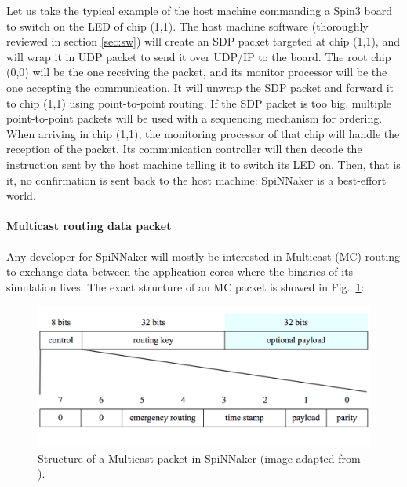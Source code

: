 Let us take the typical example of the host machine commanding a Spin3 board to switch on the LED of chip (1,1). The host machine software (thoroughly reviewed in section \ref{sec:sw}) will create an SDP packet targeted at chip (1,1), and will wrap it in UDP packet to send it over UDP/IP to the board. The root chip (0,0) will be the one receiving the packet, and its monitor processor will be the one accepting the communication. It will unwrap the SDP packet and forward it to chip (1,1) using point-to-point routing. If the SDP packet is too big, multiple point-to-point packets will be used with a sequencing mechanism for ordering. When arriving in chip (1,1), the monitoring processor of that chip will handle the reception of the packet. Its communication controller will then decode the instruction sent by the host machine telling it to switch its LED on. Then, that is it, no confirmation is sent back to the host machine: SpiNNaker is a best-effort world.


\paragraph{Multicast routing data packet}

Any developer for SpiNNaker will mostly be interested in Multicast (MC) routing to exchange data between the application cores where the binaries of its simulation lives. The exact structure of an MC packet is showed in Fig.~\ref{fig:mc_pkt_layout}:

\begin{figure}[hbtp]
\centering
\includegraphics[width = 0.95\hsize]{figures/mc_pkt_layout.png}
\caption{Structure of a Multicast packet in SpiNNaker (image adapted from \cite{mc_pkt_layout}).}
\label{fig:mc_pkt_layout}
\end{figure}

